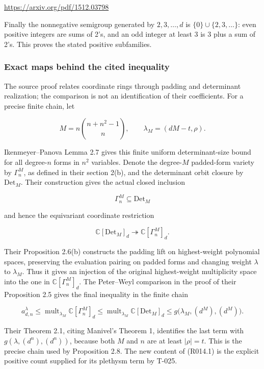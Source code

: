 \documentclass[
  10pt,
]{article}
\begin{document}
\url{https://arxiv.org/pdf/1512.03798}

Finally the nonnegative semigroup generated by \(2,3,\ldots,d\) is
\(\{0\}\cup\{2,3,\ldots\}\): even positive integers are sums of 2's, and
an odd integer at least 3 is 3 plus a sum of 2's. This proves the stated
positive subfamilies.

\subsubsection{Exact maps behind the cited
inequality}\label{exact-maps-behind-the-cited-inequality}

The source proof relates coordinate rings through padding and
determinant realization; the comparison is not an identification of
their coefficients. For a precise finite chain, let

\[
 M=n\binom{n+n^2-1}{n},
 \qquad
 \lambda_M=(dM-t,\rho).
\]

Ikenmeyer--Panova Lemma 2.7 gives this finite uniform determinant-size
bound for all degree-\(n\) forms in \(n^2\) variables. Denote the
degree-\(M\) padded-form variety by \(\Gamma_n^M\), as defined in their
section 2(b), and the determinant orbit closure by \(\mathrm{Det}_M\).
Their construction gives the actual closed inclusion

\[
 \Gamma_n^M\subseteq\mathrm{Det}_M
\]

and hence the equivariant coordinate restriction

\[
 \mathbb C[\mathrm{Det}_M]_d
 \twoheadrightarrow\mathbb C[\Gamma_n^M]_d.
\]

Their Proposition 2.6(b) constructs the padding lift on highest-weight
polynomial spaces, preserving the evaluation pairing on padded forms and
changing weight \(\lambda\) to \(\lambda_M\). Thus it gives an injection
of the original highest-weight multiplicity space into the one in
\(\mathbb C[\Gamma_n^M]_d\). The Peter--Weyl comparison in the proof of
their Proposition 2.5 gives the final inequality in the finite chain

\[
 a_{d,n}^{\lambda}
 \le
 \operatorname{mult}_{\lambda_M}\mathbb C[\Gamma_n^M]_d
 \le
 \operatorname{mult}_{\lambda_M}\mathbb C[\mathrm{Det}_M]_d
 \le
 g\bigl(\lambda_M,(d^M),(d^M)\bigr).
\]

Their Theorem 2.1, citing Manivel's Theorem 1, identifies the last term
with \(g(\lambda,(d^n),(d^n))\), because both \(M\) and \(n\) are at
least \(|\rho|=t\). This is the precise chain used by Proposition 2.8.
The new content of (R014.1) is the explicit positive count supplied for
its plethysm term by T-025.
\end{document}
